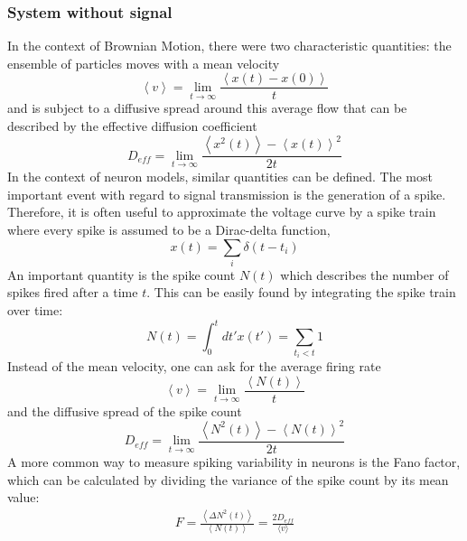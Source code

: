 \documentclass[12pt,a4paper]{article}
\begin{document}
\subsubsection{System without signal}
In the context of Brownian Motion, there were two characteristic quantities: the ensemble of particles moves with a mean velocity
\begin{equation}
\left\langle v\right\rangle =\lim_{t\rightarrow\infty}\frac{\left\langle x(t)-x(0) \right\rangle}{t}
\end{equation}
and is subject to a diffusive spread around this average flow that can be described by the effective diffusion coefficient
\begin{equation}
D_{eff}=\lim_{t\rightarrow\infty}\frac{\left\langle x^2(t) \right\rangle-\left\langle x(t)\right\rangle ^2}{2t}
\end{equation}
In the context of neuron models, similar quantities can be defined. The most important event with regard to signal transmission is the generation of a spike. Therefore, it is often useful to approximate the voltage curve by a spike train where every spike is assumed to be a Dirac-delta function,
\begin{equation}
x(t)=\sum_{i}\delta(t-t_i)
\end{equation}
An important quantity is the spike count $N(t)$ which describes the number of spikes fired after a time $t$. This can be easily found by integrating the spike train over time:
\begin{equation}
N(t)=\int_{0}^{t}dt'x(t')=\sum_{t_i<t} 1
\end{equation}
Instead of the mean velocity, one can ask for the average firing rate
\begin{equation}
\left\langle v\right\rangle =\lim_{t\rightarrow\infty}\frac{\left\langle N(t) \right\rangle}{t}
\end{equation} 
and the diffusive spread of the spike count
\begin{equation}
D_{eff}=\lim_{t\rightarrow\infty}\frac{\left\langle N^2(t) \right\rangle-\left\langle N(t)\right\rangle ^2}{2t}
\end{equation}
A more common way to measure spiking variability in neurons is the Fano factor, which can be calculated by dividing the variance of the spike count by its mean value:
\begin{align*}
F=\frac{\left\langle \Delta N^2(t) \right\rangle}{\left\langle N(t)\right\rangle}=\frac{2D_{eff}}{\langle v\rangle}
\end{align*}
\end{document}
